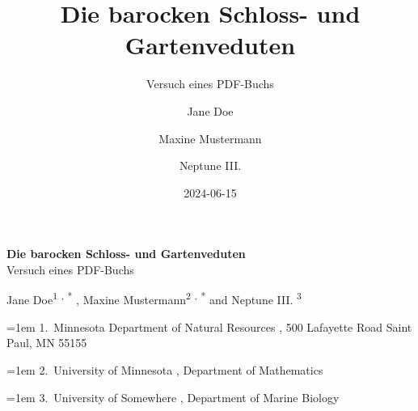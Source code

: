 \documentclass[
  11pt,
  a4paper,
  openany]{book}
\title{Die barocken Schloss- und Gartenveduten}
\subtitle{Versuch eines PDF-Buchs}
\author{Jane Doe \and Maxine Mustermann \and Neptune III.}
\date{2024-06-15}
\begin{document}
  \begin{frontmatter}
  \begin{titlepage}




  \begin{tcolorbox}


  \centering

  {\Huge\bfseries\nohyphens{Die barocken Schloss- und
  Gartenveduten}}\\[1\baselineskip]
    {\huge{Versuch eines PDF-Buchs}}\\[4\baselineskip]

  \end{tcolorbox}

  \bigbreak

  \begin{tcolorbox}

        {\large{Jane Doe}}{\textsuperscript{1}}%
    \textsuperscript{,}%
    {\textsuperscript{*}}%
    , 
        {\large{Maxine Mustermann}}{\textsuperscript{2}}%
    \textsuperscript{,}%
    {\textsuperscript{*}}%
      { and \large{Neptune III.}}%
    {\textsuperscript{3}}%
    
    
  \vspace{2\baselineskip} 

  \hangindent=1em
  {1}.~{Minnesota Department of Natural Resources}%
  , %
  {500 Lafayette Road Saint Paul, MN 55155}%
  \par\hangindent=1em%
  {2}.~{University of Minnesota}%
  , %
  {Department of Mathematics}%
  \par\hangindent=1em%
  {3}.~{University of Somewhere}%
  , %
  {Department of Marine Biology}%



\end{tcolorbox}
\end{titlepage}
\end{frontmatter}
\end{document}
